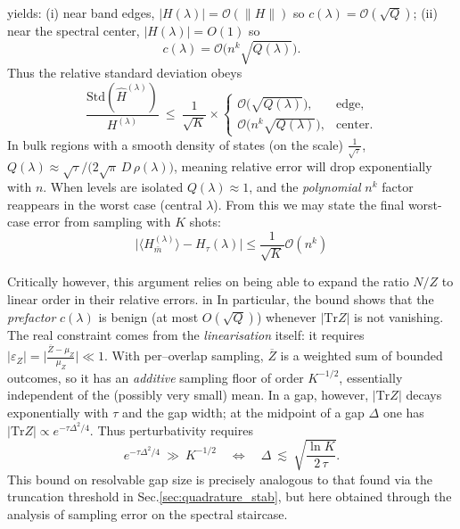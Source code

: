 \documentclass[reprint, aps,prx,showpacs,bibfootnote,preprintnumbers, mathtools, superscriptaddress, amsmath,amssymb]{revtex4-2}
\begin{document}
yields:
(i) near band edges, $|H(\lambda)|=\mathcal{O}(\|H\|)$ so $c(\lambda)=\mathcal{O}(\sqrt{Q})$;
(ii) near the spectral center, $|H(\lambda)|=O(1)$ so
\begin{equation}
c(\lambda)=\mathcal{O}\big(n^k\sqrt{Q(\lambda)}\big).
\end{equation}
Thus the relative standard deviation obeys
\begin{equation}
\frac{\mathrm{Std}(\widehat H^{(\lambda)})}{H^{(\lambda)}}
\ \le\ \frac{1}{\sqrt{K}}\times
\begin{cases}
\mathcal{O}\big(\sqrt{Q(\lambda)}\big), & \text{edge},
\\ \mathcal{O}\big(n^k\sqrt{Q(\lambda)}\big), & \text{center}.
\end{cases}
\end{equation}
In bulk regions with a smooth density of states (on the scale) $\frac{1}{\sqrt{\tau}}$, $Q(\lambda)\approx
\sqrt{\tau}/\!\big(2\sqrt{\pi}\,D\,\rho(\lambda)\big)$, meaning relative error will drop exponentially with $n$. When levels are isolated $Q(\lambda)\approx 1$, and the \emph{polynomial} $n^k$ factor reappears in the worst case (central $\lambda$). From this we may state the final worst-case error from sampling with $K$ shots:
\begin{equation}
\label{eq:minimal-bound-sampling-app}
\big|\langle H_{\bar m}^{(\lambda)}\rangle -H_\tau(\lambda) \big| \le \frac{1}{\sqrt{K}}\mathcal{O}(n^k)
\end{equation}


Critically however, this argument relies on being able to expand the ratio $N/Z$ to linear order in their relative errors.  in In particular, the bound shows that the \emph{prefactor} $c(\lambda)$ is benign (at most
$O(\sqrt{Q})$) whenever $|\mathrm{Tr}Z|$ is not vanishing. The real constraint comes from the
\emph{linearisation} itself: it requires $|\varepsilon_Z|=\big|\tfrac{\overline Z-\mu_Z}{\mu_Z}\big|\ll1$.
With per–overlap sampling, $\overline Z$ is a weighted sum of bounded outcomes, so it has an
\emph{additive} sampling floor of order $K^{-1/2}$, essentially independent of the (possibly very
small) mean. In a gap, however, $|\mathrm{Tr}Z|$ decays exponentially with $\tau$ and the gap width;
at the midpoint of a gap $\Delta$ one has $|\mathrm{Tr}Z|\propto e^{-\tau\Delta^2/4}$. Thus
perturbativity requires
\[
e^{-\tau\Delta^2/4}\ \gg\ K^{-1/2}
\quad\Longleftrightarrow\quad
\Delta\ \lesssim\ \sqrt{\frac{\ln K}{2\,\tau}}.
\]
This bound on resolvable gap size is precisely analogous to that found via the truncation threshold in Sec.\ref{sec:quadrature_stab}, but here obtained through the analysis of sampling error on the spectral staircase.



\end{document}
